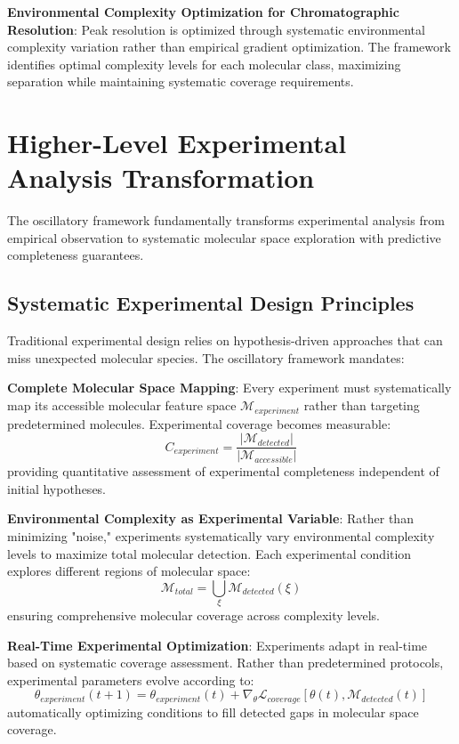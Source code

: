 \documentclass[11pt,a4paper]{article}
\begin{document}
\textbf{Environmental Complexity Optimization for Chromatographic Resolution}: Peak resolution is optimized through systematic environmental complexity variation rather than empirical gradient optimization. The framework identifies optimal complexity levels for each molecular class, maximizing separation while maintaining systematic coverage requirements.

\section{Higher-Level Experimental Analysis Transformation}

The oscillatory framework fundamentally transforms experimental analysis from empirical observation to systematic molecular space exploration with predictive completeness guarantees.

\subsection{Systematic Experimental Design Principles}

Traditional experimental design relies on hypothesis-driven approaches that can miss unexpected molecular species. The oscillatory framework mandates:

\textbf{Complete Molecular Space Mapping}: Every experiment must systematically map its accessible molecular feature space $\mathcal{M}_{experiment}$ rather than targeting predetermined molecules. Experimental coverage becomes measurable:
\begin{equation}
C_{experiment} = \frac{|\mathcal{M}_{detected}|}{|\mathcal{M}_{accessible}|}
\end{equation}
providing quantitative assessment of experimental completeness independent of initial hypotheses.

\textbf{Environmental Complexity as Experimental Variable}: Rather than minimizing "noise," experiments systematically vary environmental complexity levels to maximize total molecular detection. Each experimental condition explores different regions of molecular space:
\begin{equation}
\mathcal{M}_{total} = \bigcup_{\xi} \mathcal{M}_{detected}(\xi)
\end{equation}
ensuring comprehensive molecular coverage across complexity levels.

\textbf{Real-Time Experimental Optimization}: Experiments adapt in real-time based on systematic coverage assessment. Rather than predetermined protocols, experimental parameters evolve according to:
\begin{equation}
\theta_{experiment}(t+1) = \theta_{experiment}(t) + \nabla_{\theta} \mathcal{L}_{coverage}[\theta(t), \mathcal{M}_{detected}(t)]
\end{equation}
automatically optimizing conditions to fill detected gaps in molecular space coverage.
\end{document}
